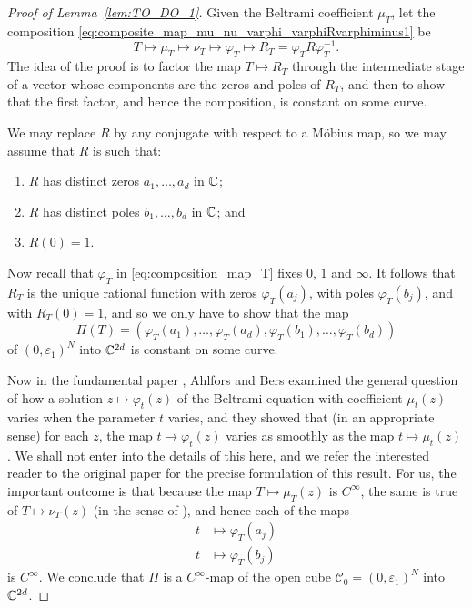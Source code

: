 \begin{proof}[Proof of Lemma~\ref{lem:TO_DO_1}]
    Given the Beltrami coefficient $\mu_T$, let the composition
    \eqref{eq:composite_map_mu_nu_varphi_varphiRvarphiminus1} be
    \begin{equation}
        \label{eq:composition_map_T}
        T \mapsto \mu_T \mapsto \nu_T \mapsto \varphi_T \mapsto R_T = \varphi_T R \varphi_T^{-1}.
    \end{equation}
    The idea of the proof is to factor the map $T \mapsto R_T$ through the
    intermediate stage of a vector whose components are the zeros and poles of
    $R_T$, and then to show that the first factor, and hence the composition, is
    constant on some curve.

    We may replace $R$ by any conjugate with respect to a Möbius map, so we may
    assume that $R$ is such that:
    \begin{enumerate}[label=(\arabic*)]
        \item \label{itm:R_distinct_zeros} $R$ has distinct zeros $a_1, \dots,
        a_d$ in $\mathbb{C}$;
        \item \label{itm:R_distinct_poles} $R$ has distinct poles $b_1, \dots,
        b_d$ in $\mathbb{C}$; and
        \item \label{itm:R_origin_is_1} $R(0) = 1$.
    \end{enumerate}

    Now recall that $\varphi_T$ in \eqref{eq:composition_map_T} fixes $0$, $1$
    and $\infty$. It follows that $R_T$ is the unique rational function with
    zeros $\varphi_T(a_j)$, with poles $\varphi_T(b_j)$, and with $R_T(0) = 1$,
    and so we only have to show that the map
    \begin{equation*}
        \Pi(T) = (\varphi_T(a_1), \dots, \varphi_T(a_d), \varphi_T(b_1), \dots, \varphi_T(b_d))
    \end{equation*}
    of $(0, \varepsilon_1)^N$ into $\mathbb{C}^{2d}$ is constant on some curve.

    Now in the fundamental paper \cite{Ahlfors1960}, Ahlfors and Bers examined
    the general question of how a solution $z \mapsto \varphi_t(z)$ of the
    Beltrami equation with coefficient $\mu_t(z)$ varies when the parameter $t$
    varies, and they showed that (in an appropriate sense) for each $z$, the map
    $t \mapsto \varphi_t(z)$ varies as smoothly as the map $t \mapsto \mu_t(z)$.
    We shall not enter into the details of this here, and we refer the
    interested reader to the original paper for the precise formulation of this
    result. For us, the important outcome is that because the map $T \mapsto
    \mu_T(z)$ is $C^\infty$, the same is true of $T \mapsto \nu_T(z)$ (in the
    sense of \cite{Ahlfors1960}), and hence each of the maps
    \begin{align*}
        t &\mapsto \varphi_T(a_j) \\
        t &\mapsto \varphi_T(b_j)
    \end{align*}
    is $C^\infty$. We conclude that $\Pi$ is a $C^\infty$-map of the open cube
    $\mathscr{C}_0 = (0, \varepsilon_1)^N$ into $\mathbb{C}^{2d}$.


\end{proof}
